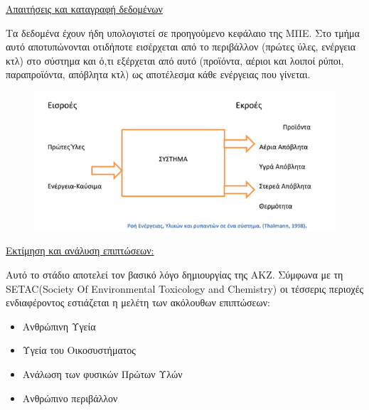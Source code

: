 \documentclass[12pt]{article}
\newcommand{\gr}{\selectlanguage{greek}}
\newcommand{\eng}{\selectlanguage{english}}
\begin{document}
 	\underline{Απαιτήσεις και καταγραφή δεδομένων}
 	
 	Τα δεδομένα έχουν ήδη υπολογιστεί σε προηγούμενο κεφάλαιο της ΜΠΕ. Στο τμήμα αυτό αποτυπώνονται οτιδήποτε εισέρχεται από το περιβάλλον (πρώτες ύλες, ενέργεια κτλ) στο σύστημα  και ό,τι εξέρχεται από αυτό (προϊόντα, αέριοι και λοιποί ρύποι, παραπροϊόντα, απόβλητα κτλ) ως αποτέλεσμα κάθε ενέργειας που γίνεται.
 	
 	\begin{figure} [H]
 		\begin{center}
 			\includegraphics [scale = 0.80] {diagram9.png}
 		\end{center}
 	\end{figure}
 
 	\underline{Εκτίμηση και ανάλυση επιπτώσεων:}
 	
 	Αυτό το στάδιο αποτελεί τον βασικό λόγο δημιουργίας της ΑΚΖ. Σύμφωνα με τη \eng SETAC(Society Of Environmental Toxicology and Chemistry) \gr οι τέσσερις περιοχές ενδιαφέροντος εστιάζεται η μελέτη των ακόλουθων επιπτώσεων:
 	
 	\begin{itemize}
 		\item Ανθρώπινη Υγεία
 		\item Υγεία του Οικοσυστήματος
 		\item Ανάλωση των φυσικών Πρώτων Υλών
 		\item Ανθρώπινο περιβάλλον
 	\end{itemize}
 
\end{document}
